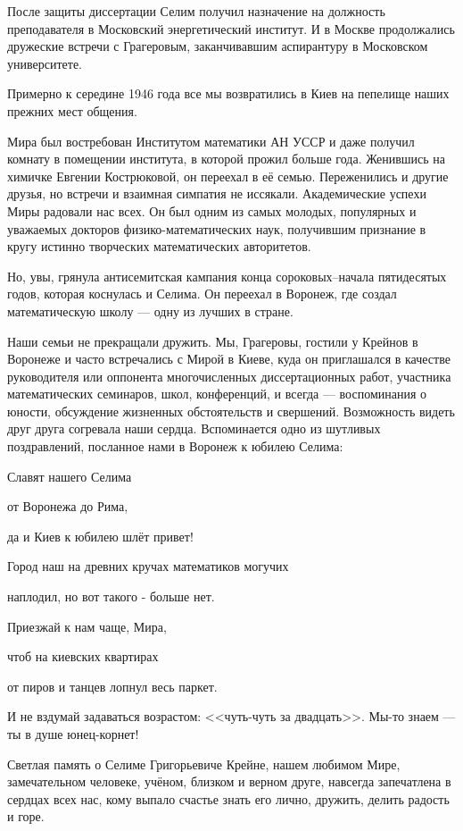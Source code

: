 После защиты диссертации Селим получил назначение на должность преподавателя в Московский энергетический институт.
И в Москве продолжались дружеские встречи с Грагеровым, заканчивавшим аспирантуру в Московском
\linebreak
университете.

Примерно к середине 1946 года все мы возвратились в Киев на пепелище наших прежних мест общения.

Мира был востребован Институтом математики АН \linebreak УССР и даже получил комнату в помещении института, в которой прожил больше года. Женившись на химичке Евгении Кострюковой, он переехал в её семью. Переженились и другие друзья, но встречи и взаимная симпатия не иссякали. Академические успехи Миры радовали нас всех. Он был одним из самых молодых, популярных и уважаемых докторов физико-математических наук, получившим признание в кругу истинно творческих математических авторитетов.

Но, увы, грянула антисемитская кампания конца со\-ро\-ко\-вых--начала пятидесятых годов, которая коснулась и Селима.
Он переехал в Воронеж, где создал математическую школу --- одну из лучших в стране.

Наши семьи не прекращали дружить. Мы, Грагеровы, гостили у Крейнов в Воронеже и часто встречались с Мирой в Киеве, куда он приглашался в качестве руководителя или оппонента многочисленных диссертационных работ, участника математических семинаров, школ, конференций, и всегда --- воспоминания о юности, обсуждение жизненных обстоятельств и свершений. Возможность видеть друг друга согревала наши сердца. Вспоминается одно из шутливых поздравлений, посланное нами в Воронеж к юбилею Селима:

Славят нашего Селима

от Воронежа до Рима,

да и Киев к юбилею шлёт привет!

Город наш на древних кручах математиков могучих

наплодил, но вот такого - больше нет.

Приезжай к нам чаще, Мира,

чтоб на киевских квартирах

от пиров и танцев лопнул весь паркет.

И не вздумай задаваться возрастом: <<чуть-чуть за двадцать>>. Мы-то знаем --- ты в душе юнец-корнет!

Светлая память о Селиме Григорьевиче Крейне, нашем любимом Мире, замечательном человеке, учёном, близком и верном друге, навсегда запечатлена в сердцах всех нас, кому выпало счастье знать его лично, дружить, делить радость и горе.

